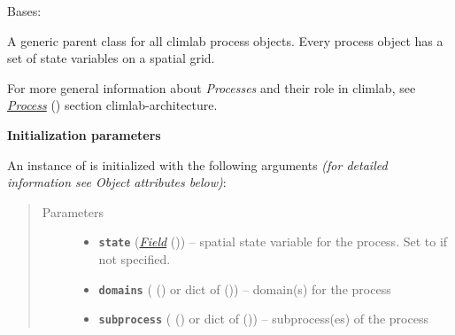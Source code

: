 \documentclass[a4paper,10pt,english]{sphinxmanual}
\begin{document}
\begin{fulllineitems}
\label{api/climlab.process:climlab.process.process.Process}
Bases: \href{http://docs.python.org/2.7/library/functions.html\#object}{}

A generic parent class for all climlab process objects.
Every process object has a set of state variables on a spatial grid.

For more general information about \emph{Processes} and their role in climlab,
see {\hyperref[architecture:process\string-architecture]{\emph{Process}}} () section climlab-architecture.

\textbf{Initialization parameters}

An instance of  is initialized with the following 
arguments \emph{(for detailed information see Object attributes below)}:
\begin{quote}\begin{description}
\item[{Parameters}] \leavevmode\begin{itemize}
\item {} 
\textbf{\texttt{state}} ({\hyperref[api/climlab.domain:climlab.domain.field.Field]{\emph{\emph{Field}}}} ()) -- spatial state variable for the process. 
Set to  if not specified.

\item {} 
\textbf{\texttt{domains}} ({\hyperref[api/climlab.domain:climlab.domain.domain._Domain]{\emph{}}} () or dict of 
{\hyperref[api/climlab.domain:climlab.domain.domain._Domain]{\emph{}}} ()) -- domain(s) for the process

\item {} 
\textbf{\texttt{subprocess}} ({\hyperref[api/climlab.process:climlab.process.process.Process]{\emph{}}} () or dict of 
{\hyperref[api/climlab.process:climlab.process.process.Process]{\emph{}}} ()) -- subprocess(es) of the process


\end{itemize}
\end{description}
\end{quote}
\end{fulllineitems}
\end{document}
